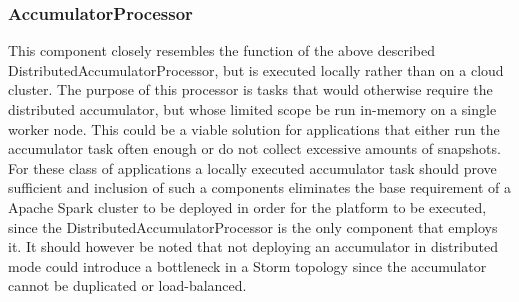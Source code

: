 

\subsubsection*{AccumulatorProcessor}
This component closely resembles the function of the above described DistributedAccumulatorProcessor, but is executed locally rather than on a cloud cluster. The purpose of this processor is tasks that would otherwise require the distributed accumulator, but whose limited scope be run in-memory on a single worker node. This could be a viable solution for applications that either run the accumulator task often enough or do not collect excessive amounts of snapshots. For these class of applications a locally executed accumulator task should prove sufficient and inclusion of such a components eliminates the base requirement of a Apache Spark cluster to be deployed in order for the platform to be executed, since the DistributedAccumulatorProcessor is the only component that employs it. It should however be noted that not deploying an accumulator in distributed mode could introduce a bottleneck in a Storm topology since the accumulator cannot be duplicated or load-balanced.

